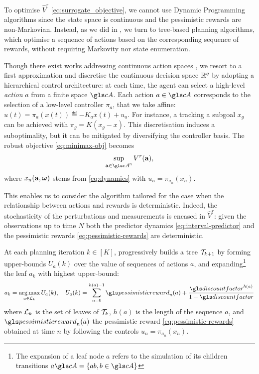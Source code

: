 To optimise $\hat{V}^r$ \eqref{eq:surrogate_objective}, we cannot use Dynamic Programming algorithms since the state space is continuous and the pessimistic rewards are non-Markovian. Instead, as we did in , we turn to tree-based planning algorithms, which optimise a sequence of actions based on the corresponding sequence of rewards, without requiring Markovity nor state enumeration.

Though there exist works addressing continuous action spaces \citep{Busoniu2018,Weinstein2012}, we resort to a first approximation and discretise the continuous decision space $\mathbb{R}^q$ by adopting a hierarchical control architecture: at each time, the agent can select a high-level \emph{action} $a$ from a finite space $\cA$. Each action $a\in\cA$ corresponds to the selection of a low-level controller $\pi_a$, that we take affine: $u(t) = \pi_a(x(t)) \eqdef -K_a x(t) + u_a.$ For instance, a tracking a subgoal $x_g$ can be achieved with $\pi_g = K(x_g - x)$. This discretisation induces a suboptimality, but it can be mitigated by diversifying the controller basis.
The robust objective \eqref{eq:minimax-obj} becomes
\[\sup_{\ba\in{\cA}^\Natural} V^r(\ba),\]
where $x_n(\mathbf{a}, \bm{\omega})$ stems from \eqref{eq:dynamics} with $u_n = \pi_{a_n}(x_n)$.

This enables us to consider the \OPD algorithm \citep{Hren2008} tailored for the case when the relationship between actions and rewards is deterministic. Indeed, the stochasticity of the perturbations and measurements is encased in $\hat{V}^r$: given the observations up to time $N$ both the predictor dynamics \eqref{eq:interval-predictor} and the pessimistic rewards \eqref{eq:pessimistic-rewards} are deterministic.

At each planning iteration $k\in[K]$, \OPD progressively builds a tree $\mathcal{T}_{k+1}$ by forming upper-bounds $U_a(k)$ over the value of sequences of actions $a$, and expanding\footnote{The expansion of a leaf node $a$ refers to the simulation of its children transitions $a\cA = \{ab, b\in \cA\}$} the leaf $a_k$ with highest upper-bound:
\begin{equation}
\label{eq:opd}
a_k = \argmax_{a\in\cL_k} U_a(k), \quad U_a(k) = \sum_{n=0}^{h(a)-1} \pessimisticreward_n(a) + \frac{\discount^{h(a)}}{1-\discount}
\end{equation}
where $\mathcal{L}_k$ is the set of leaves of $\mathcal{T}_k$, $h(a)$ is the length of the sequence $a$, and $\pessimisticreward_n(a)$ the pessimistic reward \eqref{eq:pessimistic-rewards} obtained at time $n$ by following the controls $u_n = \pi_{a_n}(x_n)$.

